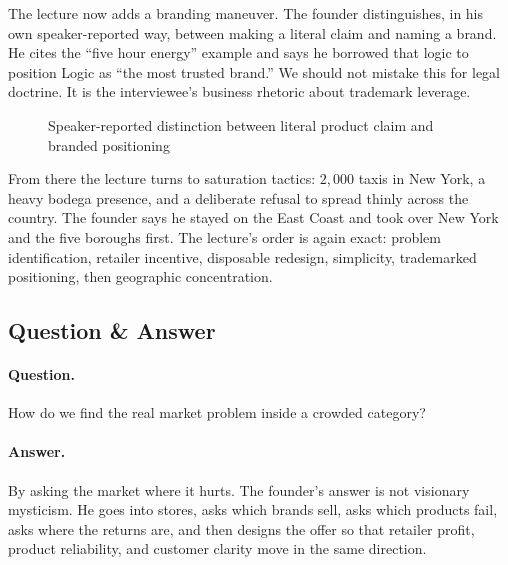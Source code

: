 The lecture now adds a branding maneuver. The founder distinguishes, in his own speaker-reported way, between making a literal claim and naming a brand. He cites the ``five hour energy'' example and says he borrowed that logic to position Logic as ``the most trusted brand.'' We should not mistake this for legal doctrine. It is the interviewee's business rhetoric about trademark leverage.

\begin{figure}[h]
\centering
{}
\caption{Speaker-reported distinction between literal product claim and branded positioning}
\end{figure}

From there the lecture turns to saturation tactics: \(2{,}000\) taxis in New York, a heavy bodega presence, and a deliberate refusal to spread thinly across the country. The founder says he stayed on the East Coast and took over New York and the five boroughs first. The lecture's order is again exact: problem identification, retailer incentive, disposable redesign, simplicity, trademarked positioning, then geographic concentration.

\subsection{Question \& Answer}

\paragraph{Question.} How do we find the real market problem inside a crowded category?

\paragraph{Answer.} By asking the market where it hurts. The founder's answer is not visionary mysticism. He goes into stores, asks which brands sell, asks which products fail, asks where the returns are, and then designs the offer so that retailer profit, product reliability, and customer clarity move in the same direction.

